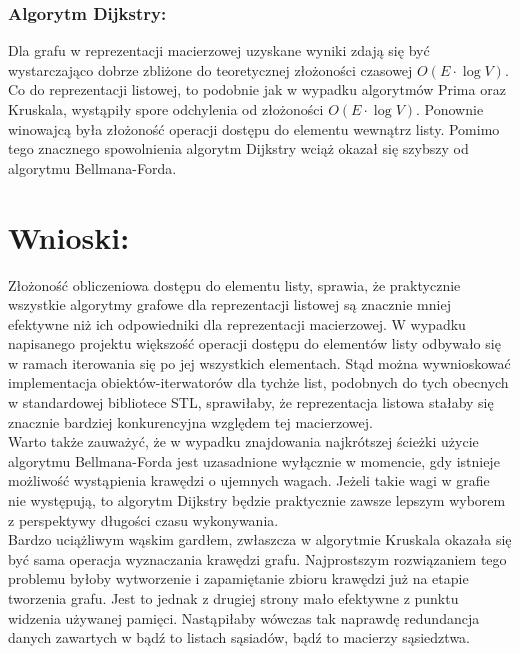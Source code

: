 \documentclass[a4paper,12pt]{article}
\begin{document}
\subsubsection{Algorytm Dijkstry:}
Dla grafu w reprezentacji macierzowej uzyskane wyniki zdają się być wystarczająco dobrze zbliżone do teoretycznej złożoności czasowej $O(E \cdot \log V)$. \\

\noindent
Co do reprezentacji listowej, to podobnie jak w wypadku algorytmów Prima oraz Kruskala, wystąpiły spore odchylenia od złożoności $O(E \cdot \log V)$. Ponownie winowajcą była złożoność operacji dostępu do elementu wewnątrz listy. Pomimo tego znacznego spowolnienia algorytm Dijkstry wciąż okazał się szybszy od algorytmu Bellmana-Forda.

\section{Wnioski:}
Złożoność obliczeniowa dostępu do elementu listy, sprawia, że praktycznie wszystkie algorytmy grafowe dla reprezentacji listowej są znacznie mniej efektywne niż ich odpowiedniki dla reprezentacji macierzowej. W wypadku napisanego projektu większość operacji dostępu do elementów listy odbywało się w ramach iterowania się po jej wszystkich elementach. Stąd można wywnioskować implementacja obiektów-iterwatorów dla tychże list, podobnych do tych obecnych w standardowej bibliotece STL, sprawiłaby, że reprezentacja listowa stałaby się znacznie bardziej konkurencyjna względem tej macierzowej.\\

\noindent
Warto także zauważyć, że w wypadku znajdowania najkrótszej ścieżki użycie algorytmu Bellmana-Forda jest uzasadnione wyłącznie w momencie, gdy istnieje możliwość wystąpienia krawędzi o ujemnych wagach. Jeżeli takie wagi w grafie nie występują, to algorytm Dijkstry będzie praktycznie zawsze lepszym wyborem z perspektywy długości czasu wykonywania.\\

\noindent
Bardzo uciążliwym wąskim gardłem, zwłaszcza w algorytmie Kruskala okazała się być sama operacja wyznaczania krawędzi grafu. Najprostszym rozwiązaniem tego problemu byłoby wytworzenie i zapamiętanie zbioru krawędzi już na etapie tworzenia grafu. Jest to jednak z drugiej strony mało efektywne z punktu widzenia używanej pamięci. Nastąpiłaby wówczas tak naprawdę redundancja danych zawartych w bądź to listach sąsiadów, bądź to macierzy sąsiedztwa.
\end{document}
